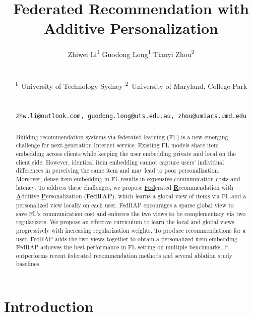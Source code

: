\documentclass{article} %
\title{Federated Recommendation with \\ Additive Personalization}
\author{%
    \centerline{Zhiwei Li\textsuperscript{1} \qquad Guodong Long\textsuperscript{1} \qquad Tianyi Zhou\textsuperscript{2}} \\
    \centerline{\textsuperscript{1}~University of Technology Sydney \qquad \textsuperscript{2}~University of Maryland, College Park} \\
    \centerline{\texttt{zhw.li@outlook.com, guodong.long@uts.edu.au, zhou@umiacs.umd.edu}}
}
\begin{document}
\maketitle

\begin{abstract}
    Building recommendation systems via federated learning (FL) is a new emerging challenge for next-generation Internet service. Existing FL models share item embedding across clients while keeping the user embedding private and local on the client side. However, identical item embedding cannot capture users' individual differences in perceiving the same item and may lead to poor personalization. Moreover, dense item embedding in FL results in expensive communication costs and latency. 
    To address these challenges, we propose \underline{\textbf{Fed}}erated \underline{\textbf{R}}ecommendation with \underline{\textbf{A}}dditive \underline{\textbf{P}}ersonalization (\textbf{FedRAP}), which learns a global view of items via FL and a personalized view locally on each user. FedRAP encourages a sparse global view to save FL's communication cost and enforces the two views to be complementary via two regularizers. We propose an effective curriculum to learn the local and global views progressively with increasing regularization weights. 
    To produce recommendations for a user, FedRAP adds the two views together to obtain a personalized item embedding. 
    FedRAP achieves the best performance in FL setting on multiple benchmarks. It outperforms recent federated recommendation methods and several ablation study baselines. 
\end{abstract}

\section{Introduction}
\label{sec:introduction}
\end{document}
